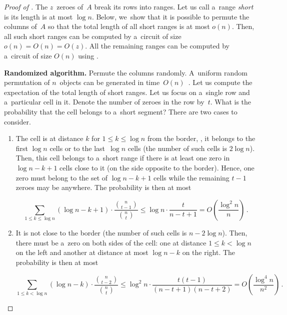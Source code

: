 \begin{proof}[Proof of {}]
    The $z$~zeroes of~$A$ break its rows into ranges.
    Let us call a~range \emph{short} is its length is at most $\log n$.
    Below, we~show that it is possible to permute the columns of~$A$
    so that the total length of all short ranges is at most $o(n)$.
    Then, all such short ranges can be computed by a~circuit of size
    $o(n)=O(n)=O(z)$. All the remaining ranges can be
    computed by a~circuit of size $O(n)$ using .

    \textbf{Randomized algorithm.}
    Permute the columns randomly. A~uniform random permutation
    of $n$~objects can be generated in
    time~$O(n)$~\cite[Algorithm~P (Shuffling)]{DBLP:books/lib/Knuth98}.
    Let us compute the expectation of
    the total length of short ranges.
    Let us focus on a~single row and a~particular cell in it. Denote the number of
    zeroes in the row by~$t$. What is the probability that the cell belongs to
    a~short segment? There are two cases to consider.


    \begin{enumerate}
        \item The cell is at distance $k$ for $1 \le k \le \log n$ from the border,
        \ie, it belongs to the first $\log n$ cells or to the last~$\log n$ cells
        (the number of such cells is $2\log n$). Then,
        this cell belongs to a~short range if there is at least one zero
        in $\log n - k + 1$ cells close to it (on the side opposite to the border).
        Hence, one zero must belong to the set of $\log n - k + 1$ cells while the
        remaining $t-1$ zeroes may be anywhere. The probability is then at most

        \[\sum_{1 \le k \le \log n}(\log n - k + 1) \cdot \frac{\binom{n}{t-1}}{\binom{n}{t}} \le \log n \cdot \frac{t}{n-t+1}=O\left(\frac{\log^2n}{n}\right) \, .\]

        \item It is not close to the border (the number of such cells is $n-2\log n$).
        Then, there must be a~zero on both sides of the cell: one at
        distance $1 \le k < \log n$ on the left and another at distance at most
        $\log n - k$ on the right. The probability is then at most

        \[\sum_{1 \le k < \log n}(\log n - k) \cdot \frac{\binom{n}{t-2}}{\binom{n}{t}} \le \log^2n \cdot \frac{t(t-1)}{(n-t+1)(n-t+2)}=O\left(\frac{\log^4 n}{n^2}\right) \, .\]


\end{enumerate}
\end{proof}
